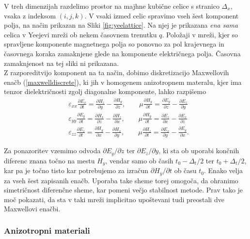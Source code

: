 \documentclass[longbibliography,slovene,a4paper,12pt]{book}
\begin{document}
V treh dimenzijah razdelimo prostor na majhne kubične celice s stranico $\Delta_x$, vsaka z indeksom $(i,j,k)$. V vsaki izmed celic spravimo vseh šest komponent polja, na način prikazan na Sliki \ref{fig:yeelattice}. Na njej je prikazana \emph{ena sama} celica v Yeejevi mreži ob nekem časovnem trenutku $q$. Položaji v mreži, kjer so spravljene komponente magnetnega polja so ponovno za pol krajevnega in časovnega koraka zamaknjene glede na komponente električnega polja. Časovna zamaknjenost na tej sliki ni prikazana.\\

Z razporeditvijo komponent na ta način, dobimo diskretizacijo Maxwellovih enačb (\ref{maxwelldiscrete}), ki jih v homogenem anizotropnem materalu, kjer ima tenzor dielektričnosti zgolj diagonalne komponente, lahko razpišemo
\begin{align}
&\varepsilon_{xx} \frac{\partial E_x}{\partial t} = \frac{\partial H_z}{\partial y} - \frac{\partial H_y}{\partial z}, \qquad \mu \frac{\partial H_y}{\partial t} = \frac{\partial E_y}{\partial z} - \frac{\partial E_z}{\partial y} \\
&\varepsilon_{yy} \frac{\partial E_y}{\partial t} = \frac{\partial H_x}{\partial z} - \frac{\partial H_z}{\partial x}, \qquad \mu \frac{\partial H_y}{\partial t} = \frac{\partial E_z}{\partial x} - \frac{\partial E_x}{\partial z} \\
&\varepsilon_{zz} \frac{\partial E_z}{\partial t} = \frac{\partial H_y}{\partial x} - \frac{\partial H_x}{\partial y}, \qquad \mu \frac{\partial H_z}{\partial t} = \frac{\partial E_x}{\partial y} - \frac{\partial E_y}{\partial x}.
\label{3Dcurleqs} 
\end{align}

Za ponazoritev vzemimo odvoda $\partial E_y/\partial z$ ter $\partial E_z/\partial y$, ki sta ob uporabi končnih diferenc znana točno na mestu $H_y$, vendar samo ob časih $t_0-\Delta_t/2$ ter $t_0+\Delta_t/2$, kar pa je točno tisto kar potrebujemo za izračun $\partial H_y/\partial t$ ob času $t_0$. Enako velja za vseh šest zapisanih enačb. Uporaba take sheme torej omogoča, da ohranimo simetričnost diferenčne sheme, kar pomeni večjo stabilnost metode\cite{cancula}. Prav tako je moč pokazati, da sta v taki mreži implicitno upoštevani tudi preostali dve Maxwellovi enačbi\cite{taflove}.

\subsubsection{Anizotropni materiali}
\end{document}
